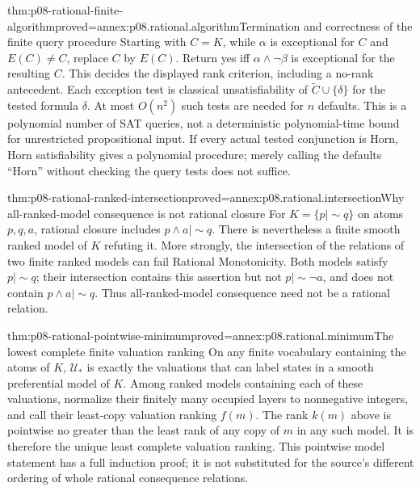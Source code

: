 \begin{hbtheorem}{thm:p08-rational-finite-algorithm}{proved=annex:p08.rational.algorithm}{Termination and correctness of the finite query procedure}
Starting with \(C=K\), while \(\alpha\) is exceptional for \(C\)
and \(E(C)\ne C\), replace \(C\) by \(E(C)\).
Return yes iff \(\alpha\wedge\neg\beta\) is exceptional for
the resulting \(C\). This decides the displayed rank criterion,
including a no-rank antecedent. Each exception test is classical
unsatisfiability of \(\widetilde C\cup\{\delta\}\) for the
tested formula \(\delta\). At most \(O(n^2)\) such tests are
needed for \(n\) defaults. This is a polynomial number of SAT
queries, not a deterministic polynomial-time bound for unrestricted
propositional input. If every actual tested conjunction is Horn, Horn
satisfiability gives a polynomial procedure; merely calling the
defaults ``Horn'' without checking the query tests does not suffice.
\end{hbtheorem}

\begin{hbtheorem}{thm:p08-rational-ranked-intersection}{proved=annex:p08.rational.intersection}{Why all-ranked-model consequence is not rational closure}
For \(K=\{p\mathrel{|\!\sim}q\}\) on atoms \(p,q,a\),
rational closure includes \(p\wedge a\mathrel{|\!\sim}q\).
There is nevertheless a finite smooth ranked model of \(K\)
refuting it. More strongly, the intersection of the relations of two
finite ranked models can fail Rational Monotonicity. Both models
satisfy \(p\mathrel{|\!\sim}q\); their intersection contains
this assertion but not \(p\mathrel{|\!\sim}\neg a\), and
does not contain \(p\wedge a\mathrel{|\!\sim}q\).
Thus all-ranked-model consequence need not be a rational relation.
\end{hbtheorem}

\begin{hbtheorem}{thm:p08-rational-pointwise-minimum}{proved=annex:p08.rational.minimum}{The lowest complete finite valuation ranking}
On any finite vocabulary containing the atoms of \(K\),
\(\mathcal U_*\) is exactly the valuations that can label states
in a smooth preferential model of \(K\). Among ranked models
containing each of these valuations, normalize their finitely many
occupied layers to nonnegative integers, and call their least-copy
valuation ranking \(f(m)\). The rank \(k(m)\) above
is pointwise no greater than the least rank of any copy of \(m\)
in any such model. It is therefore the unique least complete valuation
ranking. This pointwise model statement has a full induction proof;
it is not substituted for the source's different ordering of whole
rational consequence relations.
\end{hbtheorem}

